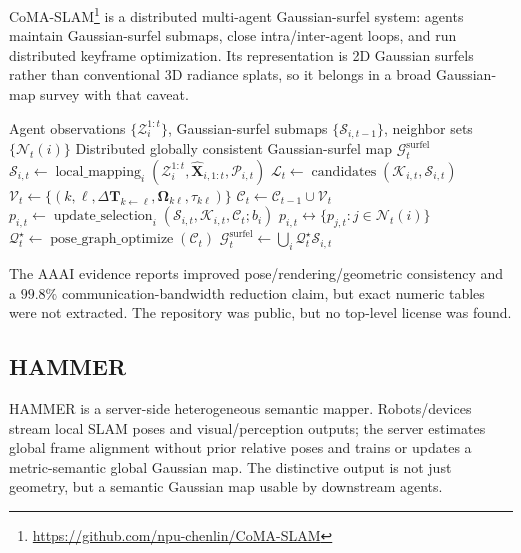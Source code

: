 \documentclass[11pt, a4paper, logo]{googledeepmind}
\begin{document}
CoMA-SLAM\footnote{\url{https://github.com/npu-chenlin/CoMA-SLAM}} \citep{chen2026coma_slam} is a distributed multi-agent Gaussian-surfel system: agents maintain Gaussian-surfel submaps, close intra/inter-agent loops, and run distributed keyframe optimization. Its representation is 2D Gaussian surfels rather than conventional 3D radiance splats, so it belongs in a broad Gaussian-map survey with that caveat.

\begin{algorithm}[H]
\caption{CoMA-SLAM}
\label{alg:coma-slam}
\small
\begin{algorithmic}[1]
  \Require Agent observations $\{\mathcal{Z}_i^{1:t}\}$, Gaussian-surfel submaps $\{\mathcal{S}_{i,t-1}\}$, neighbor sets $\{\mathcal{N}_t(i)\}$
  \Ensure Distributed globally consistent Gaussian-surfel map $\mathcal{G}^{\mathrm{surfel}}_t$
  \State $\mathcal{S}_{i,t} \gets \operatorname{local\_mapping}_i(\mathcal{Z}_i^{1:t},\hat{\mathbf{X}}_{i,1:t},\mathcal{P}_{i,t})$ 
  \State $\mathcal{L}_t \gets \operatorname{candidates}(\mathcal{K}_{i,t},\mathcal{S}_{i,t})$ 
  \State $\mathcal{V}_t \gets \{(k,\ell,\Delta\mathbf{T}_{k\leftarrow\ell},\boldsymbol{\Omega}_{k\ell},\tau_{k\ell})\}$ 
  \State $\mathcal{C}_t \gets \mathcal{C}_{t-1}\cup\mathcal{V}_t$ 
  \State $p_{i,t} \gets \operatorname{update\_selection}_i(\mathcal{S}_{i,t},\mathcal{K}_{i,t},\mathcal{C}_t;b_i)$ 
  \State $p_{i,t} \leftrightarrow \{p_{j,t}:j\in\mathcal{N}_t(i)\}$ 
  \State $\mathcal{Q}_t^\star \gets \operatorname{pose\_graph\_optimize}(\mathcal{C}_t)$ 
  \State $\mathcal{G}^{\mathrm{surfel}}_t \gets \bigcup_i\mathcal{Q}_t^\star\mathcal{S}_{i,t}$ 
\end{algorithmic}
\end{algorithm}

The AAAI evidence reports improved pose/rendering/geometric consistency and a $99.8\%$ communication-bandwidth reduction claim, but exact numeric tables were not extracted. The repository was public, but no top-level license was found.

\subsection{HAMMER}
\label{sec:systems:hammer}

HAMMER \citep{yu2025hammer} is a server-side heterogeneous semantic mapper. Robots/devices stream local SLAM poses and visual/perception outputs; the server estimates global frame alignment without prior relative poses and trains or updates a metric-semantic global Gaussian map. The distinctive output is not just geometry, but a semantic Gaussian map usable by downstream agents.
\end{document}
